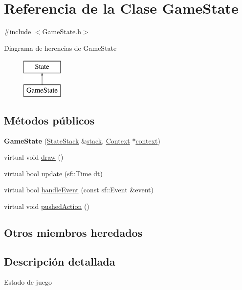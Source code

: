 \hypertarget{classGameState}{}\section{Referencia de la Clase Game\+State}
\label{classGameState}


{\ttfamily \#include $<$Game\+State.\+h$>$}

Diagrama de herencias de Game\+State\begin{figure}[H]
\begin{center}
\leavevmode
\includegraphics[height=2.000000cm]{classGameState}
\end{center}
\end{figure}
\subsection*{Métodos públicos}
\begin{DoxyCompactItemize}
\item 
\hypertarget{classGameState_ab88f7bafdb50469ca74512ad13b7cc66}{}{\bfseries Game\+State} (\hyperlink{classStateStack}{State\+Stack} \&\hyperlink{classState_a86c8d3a5a1ee89896828be85a785fb04}{stack}, \hyperlink{classContext}{Context} $\ast$\hyperlink{classState_adc93e8ad3199b5891618ca88eed0436a}{context})\label{classGameState_ab88f7bafdb50469ca74512ad13b7cc66}

\item 
virtual void \hyperlink{classGameState_a3c511417d8934943ae65c04681f321a3}{draw} ()
\item 
virtual bool \hyperlink{classGameState_a4ac988f0da5c33b43ff356890fcf9c1c}{update} (sf\+::\+Time dt)
\item 
virtual bool \hyperlink{classGameState_a000dd3306b1cb9faab5a86774a22aa6d}{handle\+Event} (const sf\+::\+Event \&event)
\item 
virtual void \hyperlink{classGameState_aaff561d6fe2a21a2084d093016a1d3be}{pushed\+Action} ()
\end{DoxyCompactItemize}
\subsection*{Otros miembros heredados}


\subsection{Descripción detallada}
Estado de juego 

